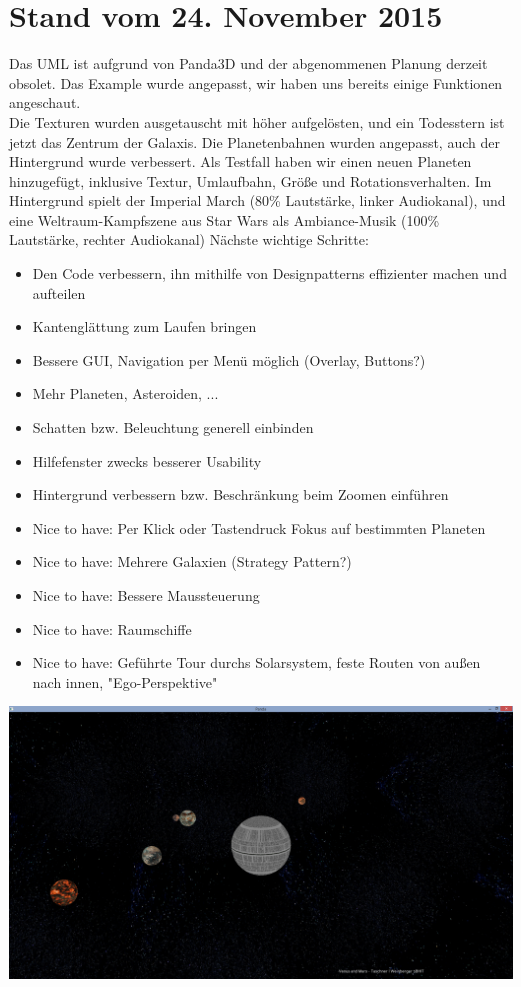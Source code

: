 \documentclass[12pt,a4paper,oneside,ngerman]{scrartcl}
\begin{document}
\section{Stand vom 24. November 2015}
Das UML ist aufgrund von Panda3D und der abgenommenen Planung derzeit obsolet.
Das Example wurde angepasst, wir haben uns bereits einige Funktionen angeschaut. \\
Die Texturen wurden ausgetauscht mit höher aufgelösten, und ein Todesstern ist jetzt das Zentrum der Galaxis. Die Planetenbahnen wurden angepasst, auch der Hintergrund wurde verbessert. Als Testfall haben wir einen neuen Planeten hinzugefügt, inklusive Textur, Umlaufbahn, Größe und Rotationsverhalten. Im Hintergrund spielt der Imperial March (80\% Lautstärke, linker Audiokanal), und eine Weltraum-Kampfszene aus Star Wars als Ambiance-Musik  (100\% Lautstärke, rechter Audiokanal) \newline
Nächste wichtige Schritte:
\begin{itemize}
\item Den Code verbessern, ihn mithilfe von Designpatterns effizienter machen und aufteilen
\item Kantenglättung zum Laufen bringen
\item Bessere GUI, Navigation per Menü möglich (Overlay, Buttons?)
\item Mehr Planeten, Asteroiden, ...
\item Schatten bzw. Beleuchtung generell einbinden
\item Hilfefenster zwecks besserer Usability
\item Hintergrund verbessern bzw. Beschränkung beim Zoomen einführen
\item Nice to have: Per Klick oder Tastendruck Fokus auf bestimmten Planeten
\item Nice to have: Mehrere Galaxien (Strategy Pattern?)
\item Nice to have: Bessere Maussteuerung
\item Nice to have: Raumschiffe
\item Nice to have: Geführte Tour durchs Solarsystem, feste Routen von außen nach innen, "Ego-Perspektive"
\end{itemize}
\includegraphics[width=1\textwidth]{24_11_Screen_1}
\newpage
\end{document}
